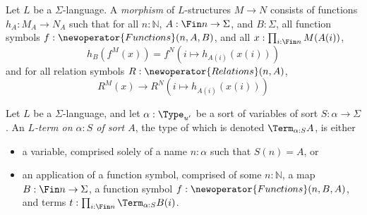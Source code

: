 \begin{definition}
  Let \( L \) be a \( \Sigma \)-language.
  A \emph{morphism} of \( L \)-structures \( M \to N \) consists of functions \( h_A : M_A \to N_A \) such that for all \( n : \mathbb N \), \( A : \Fin n \to \Sigma \), and \( B : \Sigma \), all function symbols \( f : \newoperator{Functions}(n, A, B) \), and all \( x : \prod_{i : \Fin n} M(A(i)) \),
  \[ h_B(f^M(x)) = f^N(i \mapsto h_{A(i)}(x(i))) \]
  and for all relation symbols \( R : \newoperator{Relations}(n, A) \),
  \[ R^M(x) \to R^N(i \mapsto h_{A(i)}(x(i))) \]
\end{definition}
\begin{definition}
  Let \( L \) be a \( \Sigma \)-language, and let \( \alpha : \Type_{u'} \) be a sort of variables of sort \( S : \alpha \to \Sigma \).
  An \emph{\( L \)-term on \( \alpha : S \) of sort \( A \)}, the type of which is denoted \( \Term_{\alpha:S} A \), is either
  \begin{itemize}
    \item a variable, comprised solely of a name \( n : \alpha \) such that \( S(n) = A \), or
    \item an application of a function symbol, comprised of some \( n : \mathbb N \), a map \( B : \Fin n \to \Sigma \), a function symbol \( f : \newoperator{Functions}(n, B, A) \), and terms \( t : \prod_{i : \Fin n} \Term_{\alpha:S} B(i) \).
  \end{itemize}
\end{definition}
